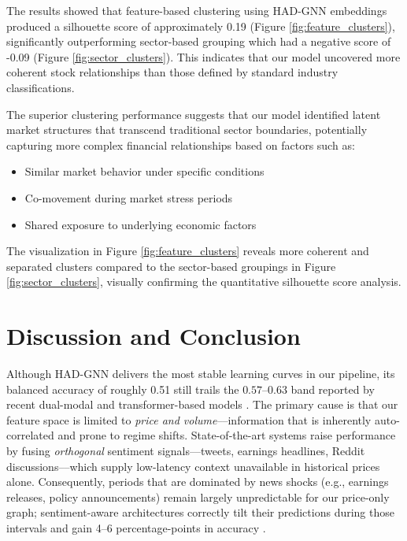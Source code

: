 \documentclass[12pt]{article}
\begin{document}
The results showed that feature-based clustering using HAD-GNN embeddings produced a silhouette score of approximately 0.19 (Figure \ref{fig:feature_clusters}), significantly outperforming sector-based grouping which had a negative score of -0.09 (Figure \ref{fig:sector_clusters}). This indicates that our model uncovered more coherent stock relationships than those defined by standard industry classifications.

The superior clustering performance suggests that our model identified latent market structures that transcend traditional sector boundaries, potentially capturing more complex financial relationships based on factors such as:

\begin{itemize}
    \item Similar market behavior under specific conditions
    \item Co-movement during market stress periods
    \item Shared exposure to underlying economic factors
\end{itemize}

The visualization in Figure \ref{fig:feature_clusters} reveals more coherent and separated clusters compared to the sector-based groupings in Figure \ref{fig:sector_clusters}, visually confirming the quantitative silhouette score analysis.

\section{Discussion and Conclusion}

Although HAD-GNN delivers the most stable learning curves in our pipeline, its balanced accuracy of roughly 0.51 still trails the $0.57$–$0.63$ band reported by recent dual-modal and transformer-based models \cite{du2023,zhang2024,liu2025}.  
The primary cause is that our feature space is limited to \emph{price and volume}––information that is inherently auto-correlated and prone to regime shifts.  
State-of-the-art systems raise performance by fusing \textit{orthogonal} sentiment signals––tweets, earnings headlines, Reddit discussions––which supply low-latency context unavailable in historical prices alone.  
Consequently, periods that are dominated by news shocks (e.g., earnings releases, policy announcements) remain largely unpredictable for our price-only graph; sentiment-aware architectures correctly tilt their predictions during those intervals and gain 4–6 percentage-points in accuracy \cite{du2023}.
\end{document}
